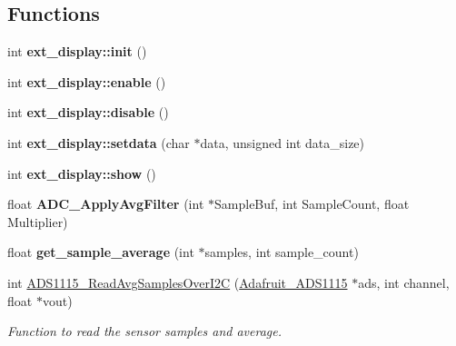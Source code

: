 \subsection*{Functions}
\begin{DoxyCompactItemize}
\item 
\mbox{\label{group___ventilator_module_ga668fb84627a25585e1812e8d957b4391}} 
int {\bfseries ext\+\_\+display\+::init} ()
\item 
\mbox{\label{group___ventilator_module_gac0cffd3b2daf581fde32c00353268cdc}} 
int {\bfseries ext\+\_\+display\+::enable} ()
\item 
\mbox{\label{group___ventilator_module_gac511ca6a1485db2d5f133e7842fb906c}} 
int {\bfseries ext\+\_\+display\+::disable} ()
\item 
\mbox{\label{group___ventilator_module_ga1790068e5672f3d2e839435509929024}} 
int {\bfseries ext\+\_\+display\+::setdata} (char $\ast$data, unsigned int data\+\_\+size)
\item 
\mbox{\label{group___ventilator_module_gae811ffa784e27a12c5e3ad5c7ea206ca}} 
int {\bfseries ext\+\_\+display\+::show} ()
\item 
\mbox{\label{group___ventilator_module_gaad68b95145642e8eec57b84b0c6c57bc}} 
float {\bfseries A\+D\+C\+\_\+\+Apply\+Avg\+Filter} (int $\ast$Sample\+Buf, int Sample\+Count, float Multiplier)
\item 
\mbox{\label{group___ventilator_module_ga5048b97e236086b0810edfb8d3abc6a2}} 
float {\bfseries get\+\_\+sample\+\_\+average} (int $\ast$samples, int sample\+\_\+count)
\item 
int \hyperlink{group___ventilator_module_gaa714b102f0e19f887c62e649837d0a49}{A\+D\+S1115\+\_\+\+Read\+Avg\+Samples\+Over\+I2C} (\hyperlink{class_adafruit___a_d_s1115}{Adafruit\+\_\+\+A\+D\+S1115} $\ast$ads, int channel, float $\ast$vout)
\begin{DoxyCompactList}\small\item\em Function to read the sensor samples and average. \end{DoxyCompactList}\item 

\end{DoxyCompactItemize}
